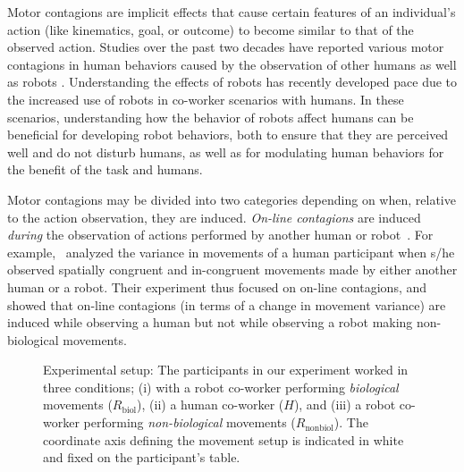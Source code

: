 Motor contagions are implicit effects that cause certain features of an individual's action (like kinematics, goal, or outcome) to become similar to that of the observed action. Studies over the past two decades have reported various motor contagions in human behaviors caused by the observation of other humans as well as robots \cite{Blakemore:Neuropsychologia:2005, Fadiga:JNeuroPhys:1995, Ganesh:Springer:2015, Sciutti:IJSR:2012, Prinz:EJPAP:1997}. Understanding the effects of robots has recently developed pace due to the increased use of robots in co-worker scenarios with humans. In these scenarios, understanding how the behavior of robots affect humans can be beneficial for developing robot behaviors, both to ensure that they are perceived well and do not disturb humans, as well as for modulating human behaviors for the benefit of the task and humans.  

Motor contagions may be divided into two categories depending on when, relative to the action observation, they are induced. \emph{On-line contagions} are induced \emph{during} the observation of actions performed by another human or robot~\cite{Kupferberg:Methods:2009, Oztop:RAS_ICHR:2004, Chaminade:JPP:2009, Kupferberg:PlosOne:2012, Brass:ActaPsych:2001, Press:CBR:2005}. For example,~\cite{Kilner:CurBio:2003} analyzed the variance in movements of a human participant when s/he observed spatially congruent and in-congruent movements made by either another human or a robot. Their experiment thus focused on on-line contagions, and showed that on-line contagions (in terms of a change in movement variance) are induced while observing a human but not while observing a robot making non-biological movements.

\begin{figure}[hb]
	\caption{Experimental setup: The participants in our experiment worked in three conditions; (i) with a robot co-worker performing \textit{biological} movements ($\textit{R}_{\text{biol}}$), (ii) a human co-worker ($\textit{H}$), and (iii) a robot co-worker performing \textit{non-biological} movements ($\textit{R}_{\text{nonbiol}}$). The coordinate axis defining the movement setup is indicated in white and fixed on the participant's table.}
	\label{fig:setup}
\end{figure}

